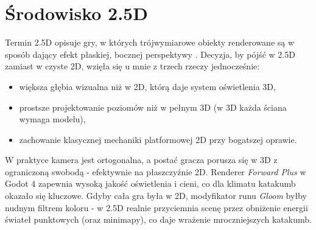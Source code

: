 \section{Środowisko 2.5D}

Termin 2.5D opisuje gry, w których trójwymiarowe obiekty renderowane są w sposób dający efekt płaskiej, bocznej perspektywy \cite{toftedahl2019taxonomy}. Decyzja, by pójść w 2.5D zamiast w czyste 2D, wzięła się u mnie z trzech rzeczy jednocześnie:

\begin{itemize}
    \item większa głębia wizualna niż w 2D, którą daje system oświetlenia 3D,
    \item prostsze projektowanie poziomów niż w pełnym 3D (w 3D każda ściana wymaga modelu),
    \item zachowanie klasycznej mechaniki platformowej 2D przy bogatszej oprawie.
\end{itemize}

W praktyce kamera jest ortogonalna, a postać gracza porusza się w 3D z ograniczoną swobodą - efektywnie na płaszczyźnie 2D. Renderer \textit{Forward Plus} w Godot 4 zapewnia wysoką jakość oświetlenia i cieni, co dla klimatu katakumb okazało się kluczowe. Gdyby cała gra była w 2D, modyfikator runu \textit{Gloom} byłby nudnym filtrem koloru - w 2.5D realnie przyciemnia scenę przez obniżenie energii świateł punktowych (oraz minimapy), co daje wrażenie mroczniejszych katakumb.
